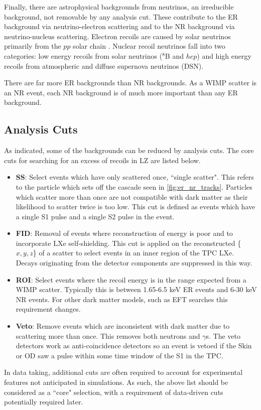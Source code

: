 \par
Finally, there are astrophysical backgrounds from neutrinos, an irreducible background, not removable by any analysis cut.
These contribute to the ER background via neutrino-electron scattering and to the NR background via neutrino-nucleus scattering.
Electron recoils are caused by solar neutrinos primarily from the $pp$ solar chain \cite{solar_neutrinos_ref}.
Nuclear recoil neutrinos fall into two categories: low energy recoils from solar neutrinos ($^{8}$B and $hep$) and high energy recoils from atmospheric and diffuse supernova neutrinos (DSN).

\par
There are far more ER backgrounds than NR backgrounds.
As a WIMP scatter is an NR event, each NR background is of much more important than any ER background.

\subsection{Analysis Cuts}
\label{sec:lz_analysis_cuts}
\par
As indicated, some of the backgrounds can be reduced by analysis cuts. 
The core cuts for searching for an excess of recoils in LZ are listed below.
\begin{itemize}
    \item \textbf{SS}: Select events which have only scattered once, ``single scatter". This refers to the particle which sets off the cascade seen in \autoref{fig:er_nr_tracks}. Particles which scatter more than once are not compatible with dark matter as their likelihood to scatter twice is too low. This cut is defined as events which have a single S1 pulse and a single S2 pulse in the event.
    \item \textbf{FID}: Removal of events where reconstruction of energy is poor and to incorporate LXe self-shielding. This cut is applied on the reconstructed \{$x,y,z$\} of a scatter to select events in an inner region of the TPC LXe. Decays originating from the detector components are suppressed in this way.
    \item \textbf{ROI}: Select events where the recoil energy is in the range expected from a WIMP scatter. Typically this is between 1.65-6.5 keV ER events and 6-30 keV NR events. For other dark matter models, such as EFT searches this requirement changes.%
    \item \textbf{Veto}: Remove events which are inconsistent with dark matter due to scattering more than once. This removes both neutrons and $\gamma$s. The veto detectors work as anti-coincidence detectors so an event is vetoed if the Skin or OD saw a pulse within some time window of the S1 in the TPC.
\end{itemize}
In data taking, additional cuts are often required to account for experimental features not anticipated in simulations.
As such, the above list should be considered as a ``core" selection, with a requirement of data-driven cuts potentially required later.

